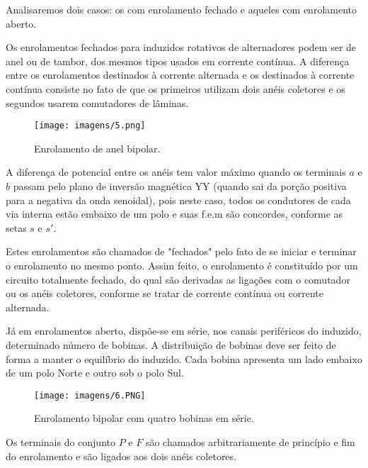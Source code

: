 Analisaremos dois casos: os com enrolamento fechado e aqueles com enrolamento aberto.

Os enrolamentos fechados para induzidos rotativos de alternadores podem ser de anel ou de tambor, dos mesmos tipos usados em corrente contínua. A diferença entre os enrolamentos destinados à corrente alternada e os destinados à corrente contínua consiste no fato de que os primeiros utilizam dois anéis coletores e os segundos usarem comutadores de lâminas.

\begin{figure}[ht!]
\center 
\texttt{[image: imagens/5.png]}
\caption{Enrolamento de anel bipolar.}
\end{figure}

A diferença de potencial entre os anéis tem valor máximo quando os terminais $a$ e $b$ passam pelo plano de inversão magnética YY (quando sai da porção positiva para a negativa da onda senoidal), pois neste caso, todos os condutores de cada via interna estão embaixo de um polo e suas f.e.m são concordes, conforme as setas $s$ e $s'$.

Estes enrolamentos são chamados de "fechados" pelo fato de se iniciar e terminar o enrolamento no mesmo ponto. Assim feito, o enrolamento é constituído por um circuito totalmente fechado, do qual são derivadas as ligações com o comutador ou os anéis coletores, conforme se tratar de corrente contínua ou corrente alternada.

Já em enrolamentos aberto, dispõe-se em série, nos canais periféricos do induzido, determinado número de bobinas. A distribuição de bobinas deve ser feito de forma a manter o equilíbrio do induzido. Cada bobina apresenta um lado embaixo de um polo Norte e outro sob o polo Sul.

\begin{figure}[ht!]
\center 
\texttt{[image: imagens/6.PNG]}
\caption{Enrolamento bipolar com quatro bobinas em série.}
\end{figure}

Os terminais do conjunto $P$ e $F$ são chamados arbitrariamente de princípio e fim do enrolamento e são ligados aos dois anéis coletores.


